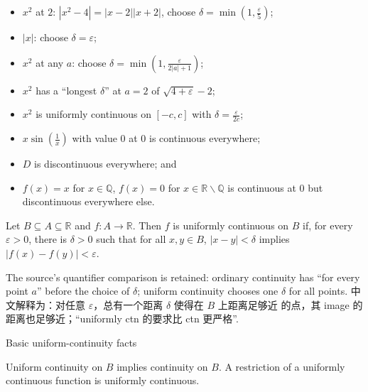 \begin{itemize}
\tightlist
\item
  \(x^{2}\) at \(2\): \(\left| {x^{2} - 4} \right| = \left| {x - 2} \right|\left| {x + 2} \right|\), choose \(\delta = \min\left( {1,\frac{\varepsilon}{5}} \right)\);
\item
  \(|x|\): choose \(\delta = \varepsilon\);
\item
  \(x^{2}\) at any \(a\): choose \(\delta = \min\left( {1,\frac{\varepsilon}{2|a| + 1}} \right)\);
\item
  \(x^{2}\) has a ``longest \(\delta\)'' at \(a = 2\) of \(\sqrt{4 + \varepsilon} - 2\);
\item
  \(x^{2}\) is uniformly continuous on \(\left\lbrack {- c,c} \right\rbrack\) with \(\delta = \frac{\varepsilon}{2c}\);
\item
  \(x\sin\left( \frac{1}{x} \right)\) with value \(0\) at \(0\) is continuous everywhere;
\item
  \(D\) is discontinuous everywhere; and
\item
  \(f(x) = x\) for \(x \in \mathbb{Q}\), \(f(x) = 0\) for \(x \in \mathbb{R} \smallsetminus \mathbb{Q}\) is continuous at \(0\) but discontinuous everywhere else.
\end{itemize}

\begin{definition}{}

Let \(B \subseteq A \subseteq \mathbb{R}\) and \(f:A\rightarrow\mathbb{R}\). Then \(f\) is uniformly continuous on \(B\) if, for every \(\varepsilon > 0\), there is \(\delta > 0\) such that for all \(x,y \in B\), \(\left| {x - y} \right| < \delta\) implies \(\left| {f(x) - f(y)} \right| < \varepsilon\).

\end{definition}

The source's quantifier comparison is retained: ordinary continuity has ``for every point \(a\)'' before the choice of \(\delta\); uniform continuity chooses one \(\delta\) for all points. 中文解释为：对任意 \(\varepsilon\)，总有一个距离 \(\delta\) 使得在 \(B\) 上距离足够近 的点，其 image 的距离也足够近；``uniformly ctn 的要求比 ctn 更严格''.

\begin{theorem}{Basic uniform-continuity facts}

Uniform continuity on \(B\) implies continuity on \(B\). A restriction of a uniformly continuous function is uniformly continuous.

\end{theorem}

